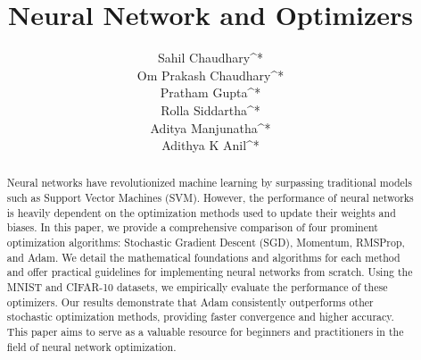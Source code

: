 \documentclass{article}
\title{Neural Network and Optimizers}
\author{
  Sahil Chaudhary^* \\
  \And
  Om Prakash Chaudhary^* \\
  \And
  Pratham Gupta^* \\
  \And
  Rolla Siddartha^*\\
  \And
  Aditya Manjunatha^*\\
  \And
  Adithya K Anil^*
}
\begin{document}
\maketitle

\def\thefootnote{*}
\def\thefootnote{\arabic{footnote}}

\begin{abstract}
Neural networks have revolutionized machine learning by surpassing traditional models such as Support Vector Machines (SVM). However, the performance of neural networks is heavily dependent on the optimization methods used to update their weights and biases. In this paper, we provide a comprehensive comparison of four prominent optimization algorithms: Stochastic Gradient Descent (SGD), Momentum, RMSProp, and Adam. We detail the mathematical foundations and algorithms for each method and offer practical guidelines for implementing neural networks from scratch. Using the MNIST and CIFAR-10 datasets, we empirically evaluate the performance of these optimizers. Our results demonstrate that Adam consistently outperforms other stochastic optimization methods, providing faster convergence and higher accuracy. This paper aims to serve as a valuable resource for beginners and practitioners in the field of neural network optimization.
\end{abstract}



\end{document}
